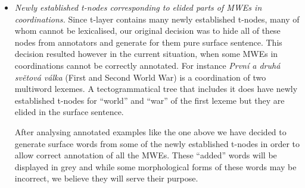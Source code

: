\begin{itemize}
%
\item \emph{Newly established t-nodes corresponding to elided parts of MWEs in coordinations.} Since t-layer contains many newly established t-nodes, many of whom cannot be lexicalised, our original decision was to hide all of these nodes from annotators and generate for them pure surface sentence. This decision resulted however in the current situation, when some MWEs in coordinations cannot be correctly annotated. 
For instance \emph{První a druhá světová válka} (First and Second World War) is a coordination of two multiword lexemes. A tectogrammatical tree that includes it does have newly established t-nodes for “world” and “war” of the first lexeme but they are elided in the surface sentence. 

After analysing annotated examples like the one above we have decided to generate surface words from some of the newly established t-nodes in order to allow correct annotation of all the MWEs. These ``added'' words will be displayed in grey and while some morphological forms of these words may be incorrect, we believe they will serve their purpose.

%

\end{itemize}

